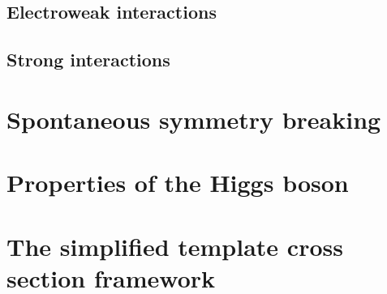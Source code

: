\subsection{Electroweak interactions}

\subsection{Strong interactions}

\section{Spontaneous symmetry breaking}

\section{Properties of the Higgs boson}

\section{The simplified template cross section framework}
